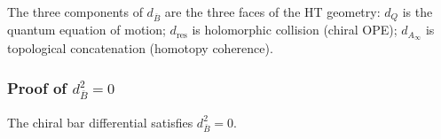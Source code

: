 \begin{remark}
The three components of $d_{\overline{B}}$ are the three faces of the HT geometry: $d_Q$ is the quantum equation of motion; $d_{\mathrm{res}}$ is holomorphic collision (chiral OPE); $d_{A_\infty}$ is topological concatenation (homotopy coherence).
\end{remark}

\subsubsection{Proof of $d_{\overline{B}}^2 = 0$}

\begin{theorem}[$d_{\overline{B}}^2 = 0$; \ClaimStatusProvedHere]
\label{thm:bar_differential_squared}
The chiral bar differential satisfies $d_{\overline{B}}^2 = 0$.
\end{theorem}

